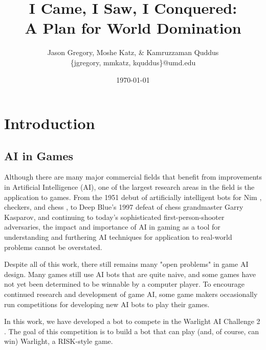 \documentclass[a4paper,11pt]{article}
\begin{document}
\title{I Came, I Saw, I Conquered: \\ A Plan for World Domination}
\author{Jason Gregory, Moshe Katz, \& Kamruzzaman Quddus \\ \{jgregory, mmkatz, kquddus\}@umd.edu}
\date{\today}

\maketitle


\section{Introduction}\label{sec:intro}
\subsection{AI in Games}\label{aiingames}
Although there are many major commercial fields that benefit from improvements
in Artificial Intelligence (AI), one of the largest research areas in the field is
the application to games.  From the 1951 debut of artificially intelligent bots
for Nim \cite{nim}, checkers, and chess \cite{checkerschess}, to Deep Blue's 1997
defeat of chess grandmaster Garry Kasparov, and continuing to today's sophisticated
first-person-shooter adversaries, the impact and importance of AI in gaming as a
tool for understanding and furthering AI techniques for application to real-world 
problems cannot be overstated.

Despite all of this work, there still remains many "open problems" in game AI
design.  Many games still use AI bots that are quite naive, and some games have
not yet been determined to be winnable by a computer player. To encourage continued
research and development of game AI, some game makers occasionally run competitions
for developing new AI bots to play their games.

In this work, we have developed a bot to compete in the Warlight AI Challenge 2 \cite{warlight}.
The goal of this competition is to build a bot that can play (and, of course, can
win) Warlight, a RISK-style game.
\end{document}

